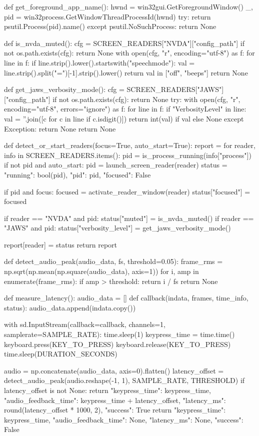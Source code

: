 \begin{pyverbatim}
	def get_foreground_app_name():
	hwnd = win32gui.GetForegroundWindow()
	_, pid = win32process.GetWindowThreadProcessId(hwnd)
	try:
	return psutil.Process(pid).name()
	except psutil.NoSuchProcess:
	return None

	def is_nvda_muted():
	cfg = SCREEN_READERS["NVDA"]["config_path"]
	if not os.path.exists(cfg):
	return None
	with open(cfg, "r", encoding="utf-8") as f:
	for line in f:
	if line.strip().lower().startswith("speechmode"):
	val = line.strip().split("=")[-1].strip().lower()
	return val in ["off", "beeps"]
	return None

	def get_jaws_verbosity_mode():
	cfg = SCREEN_READERS["JAWS"]["config_path"]
	if not os.path.exists(cfg):
	return None
	try:
	with open(cfg, "r", encoding="utf-8", errors="ignore") as f:
	for line in f:
	if "VerbosityLevel" in line:
	val = ''.join([c for c in line if c.isdigit()])
	return int(val) if val else None
	except Exception:
	return None
	return None

	def detect_or_start_readers(focus=True, auto_start=True):
	report = {}
	for reader, info in SCREEN_READERS.items():
	pid = is_process_running(info["process"])
	if not pid and auto_start:
	pid = launch_screen_reader(reader)
	status = {"running": bool(pid), "pid": pid, "focused": False}

	if pid and focus:
	focused = activate_reader_window(reader)
	status["focused"] = focused

	if reader == "NVDA" and pid:
	status["muted"] = is_nvda_muted()
	if reader == "JAWS" and pid:
	status["verbosity_level"] = get_jaws_verbosity_mode()

	report[reader] = status
	return report

	def detect_audio_peak(audio_data, fs, threshold=0.05):
	frame_rms = np.sqrt(np.mean(np.square(audio_data), axis=1))
	for i, amp in enumerate(frame_rms):
	if amp > threshold:
	return i / fs
	return None

	def measure_latency():
	audio_data = []
	def callback(indata, frames, time_info, status):
	audio_data.append(indata.copy())

	with sd.InputStream(callback=callback, channels=1, samplerate=SAMPLE_RATE):
	time.sleep(1)
	keypress_time = time.time()
	keyboard.press(KEY_TO_PRESS)
	keyboard.release(KEY_TO_PRESS)
	time.sleep(DURATION_SECONDS)

	audio = np.concatenate(audio_data, axis=0).flatten()
	latency_offset = detect_audio_peak(audio.reshape(-1, 1), SAMPLE_RATE, THRESHOLD)
	if latency_offset is not None:
	return {
			"keypress_time": keypress_time,
			"audio_feedback_time": keypress_time + latency_offset,
			"latency_ms": round(latency_offset * 1000, 2),
			"success": True
		}
	return {
			"keypress_time": keypress_time,
			"audio_feedback_time": None,
			"latency_ms": None,
			"success": False
		}


\end{pyverbatim}
